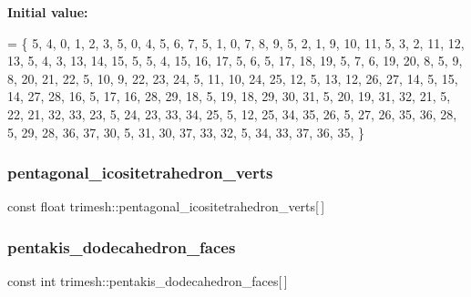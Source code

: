 {\bfseries Initial value\+:}
\begin{DoxyCode}
= \{
    5, 4, 0, 1, 2, 3,
    5, 0, 4, 5, 6, 7,
    5, 1, 0, 7, 8, 9,
    5, 2, 1, 9, 10, 11,
    5, 3, 2, 11, 12, 13,
    5, 4, 3, 13, 14, 15,
    5, 5, 4, 15, 16, 17,
    5, 6, 5, 17, 18, 19,
    5, 7, 6, 19, 20, 8,
    5, 9, 8, 20, 21, 22,
    5, 10, 9, 22, 23, 24,
    5, 11, 10, 24, 25, 12,
    5, 13, 12, 26, 27, 14,
    5, 15, 14, 27, 28, 16,
    5, 17, 16, 28, 29, 18,
    5, 19, 18, 29, 30, 31,
    5, 20, 19, 31, 32, 21,
    5, 22, 21, 32, 33, 23,
    5, 24, 23, 33, 34, 25,
    5, 12, 25, 34, 35, 26,
    5, 27, 26, 35, 36, 28,
    5, 29, 28, 36, 37, 30,
    5, 31, 30, 37, 33, 32,
    5, 34, 33, 37, 36, 35,
\}
\end{DoxyCode}
\mbox{\label{namespacetrimesh_ac9660531cc8778c4bf7261614be3c71d}} 
\subsubsection{\texorpdfstring{pentagonal\+\_\+icositetrahedron\+\_\+verts}{pentagonal\_icositetrahedron\_verts}}
{\footnotesize\ttfamily const float trimesh\+::pentagonal\+\_\+icositetrahedron\+\_\+verts\mbox{[}$\,$\mbox{]}\hspace{0.3cm}{\ttfamily [static]}}

\mbox{\label{namespacetrimesh_a51ee0566ad6bf7254f52158a396abd9d}} 
\subsubsection{\texorpdfstring{pentakis\+\_\+dodecahedron\+\_\+faces}{pentakis\_dodecahedron\_faces}}
{\footnotesize\ttfamily const int trimesh\+::pentakis\+\_\+dodecahedron\+\_\+faces\mbox{[}$\,$\mbox{]}\hspace{0.3cm}{\ttfamily [static]}}

\mbox{\label{namespacetrimesh_a5b17455ab050c41c96d91f96b545b1a6}} 
